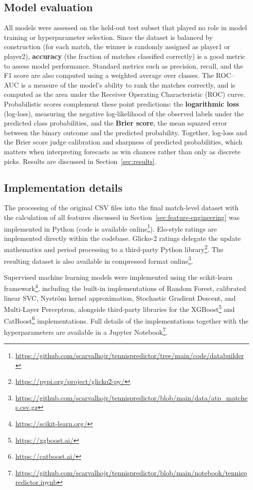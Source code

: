 \subsection{Model evaluation}

All models were assessed on the held-out test subset that played no role in model training or
hyperparameter selection. Since the dataset is balanced by construction (for each match, the winner
is randomly assigned as player1 or player2), \textbf{accuracy} (the fraction of matches classified
correctly) is a good metric to assess model performance. Standard metrics such as precision, recall,
and the F1 score are also computed using a weighted average over classes. The ROC--AUC is
a measure of the model's ability to rank the matches correctly, and is computed as the area under
the Receiver Operating Characteristic (ROC) curve. Probabilistic scores complement these point
predictions: the \textbf{logarithmic loss} (log-loss), measuring the negative log-likelihood of the
observed labels under the predicted class probabilities, and the \textbf{Brier score}, the mean
squared error between the binary outcome and the predicted probability. Together, log-loss and the
Brier score judge calibration and sharpness of predicted probabilities, which matters when
interpreting forecasts as win chances rather than only as discrete picks. Results are discussed in
Section~\ref{sec:results}.

\subsection{Implementation details}

The processing of the original CSV files into the final match-level dataset with the calculation of
all features discussed in Section~\ref{sec:feature-engineering} was implemented in Python (code is
available
online\footnote{\url{https://github.com/scarvalhojr/tennispredictor/tree/main/code/databuilder}}).
Elo-style ratings are implemented directly within the codebase. Glicko-2 ratings delegate the
update mathematics and period processing to a third-party Python
library\footnote{\url{https://pypi.org/project/glicko2-py/}}. The resulting dataset is also
available in compressed format
online\footnote{\url{https://github.com/scarvalhojr/tennispredictor/blob/main/data/atp_matches.csv.gz}}.

Supervised machine learning models
were implemented using the scikit-learn framework\footnote{\url{https://scikit-learn.org/}},
including the built-in implementations of Random Forest, calibrated linear SVC, Nyström kernel
approximation, Stochastic Gradient Descent, and Multi-Layer Perceptron, alongside third-party
libraries for the XGBoost\footnote{\url{https://xgboost.ai/}} and
CatBoost\footnote{\url{https://catboost.ai/}} implementations. Full details of the implementations
together with the hyperparameters are available in a Jupyter
Notebook\footnote{\url{https://github.com/scarvalhojr/tennispredictor/blob/main/notebook/tennispredictor.ipynb}}.


